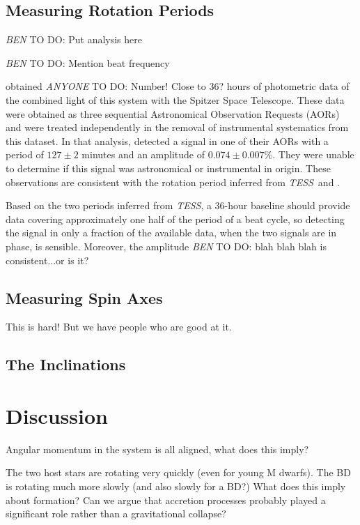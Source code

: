 \documentclass[twocolumn]{aastex63}
\newcommand{\tess}{{\it TESS}}
\newcommand{\todo}[3]{{\color{#2} \emph{#1} TO DO: #3}}
\newcommand{\btmtodo}[1]{\todo{BEN}{blue}{#1}}
\newcommand{\anytodo}[1]{\todo{ANYONE}{green}{#1}}
\begin{document}
\subsection{Measuring Rotation Periods}

\btmtodo{Put analysis here}

\btmtodo{Mention beat frequency}

\citet{Zhou20} obtained \anytodo{Number! Close to 36?} hours of photometric data of the combined light of this system with the Spitzer Space Telescope. 
These data were obtained as three sequential Astronomical Observation Requests (AORs) and were treated independently in the removal of instrumental systematics from this dataset. 
In that analysis, \citet{Zhou20} detected a signal in one of their AORs with a period of $127 \pm 2$ minutes and an amplitude of $0.074 \pm 0.007\%$.
They were unable to determine if this signal was astronomical or instrumental in origin.
These observations are consistent with the rotation period inferred from \tess\ and \hst. 

Based on the two periods inferred from \tess, a 36-hour baseline should provide data covering approximately one half of the period of a beat cycle, so detecting the signal in only a fraction of the available data, when the two signals are in phase, is sensible. Moreover, the amplitude \btmtodo{blah blah blah is consistent...or is it?}



\subsection{Measuring Spin Axes}

This is hard! But we have people who are good at it.


\subsection{The Inclinations}


\section{Discussion}

Angular momentum in the system is all aligned, what does this imply?

The two host stars are rotating very quickly (even for young M dwarfs). The BD is rotating much more slowly (and also slowly for a BD?) What does this imply about formation? Can we argue that accretion processes probably played a significant role rather than a gravitational collapse?
\end{document}
